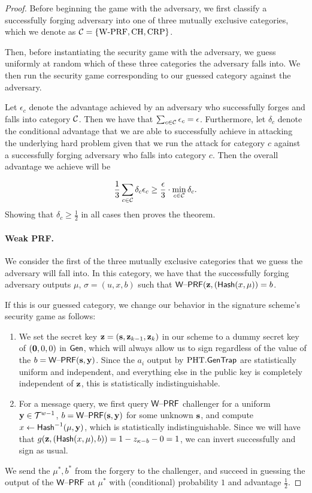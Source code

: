 \begin{proof}
Before beginning the game with the adversary, we first classify a successfully forging adversary into one of three
mutually exclusive categories, which we denote as $\mathcal{C} = \{\text{W-PRF}, \text{CH},
\text{CRP}\}$. 

Then, before instantiating the security game with the adversary, we
guess uniformly at random which of these three categories the
adversary falls into. We then run the security game corresponding to
our guessed category against the adversary. 

Let $\epsilon_{c}$ denote the advantage achieved by an
adversary who successfully forges and falls into category $\mathcal{C}$. Then we
have that $\sum_{c \in \mathcal{C}}\epsilon_{c} = \epsilon$. 
Furthermore, let
$\delta_{c}$ denote the conditional advantage that we are able to
successfully achieve in
attacking the underlying hard problem given that we run the attack for
category $c$ against a successfully forging adversary who falls into
category $c$. Then the overall advantage we achieve will be 

\[\frac{1}{3}\sum_{c \in \mathcal{C}}\delta_{c}\epsilon_{c} \geq
  \frac{\epsilon}{3} \cdot \min_{c \in \mathcal{C}} \delta_{c}.\]
Showing that $\delta_c \geq \tfrac{1}{2}$ in
all cases then proves the theorem.

 \paragraph{Weak PRF.} We consider the first of the three
 mutually exclusive categories that we guess the adversary will fall
 into. In this category, we have that the successfully forging adversary outputs $\mu$,
  $\sigma=(u,x,b)$ such that $\mathsf{W\text{\textendash}PRF}(\mathbf{z},(\mathsf{Hash}(x,\mu))=b$. 

If this is our guessed category, we change our behavior in the
  signature scheme's security game as follows:
\begin{enumerate}
\item
We set the secret key $\mathbf{z}=(\mathbf{s},\mathbf{z}_{k-1},\mathbf{z}_{k})$ in our scheme
  to a dummy secret key of $(\mathbf{0},0,0)$ in $\mathsf{Gen}$, which will
  always allow us to sign regardless of the value of the
  $b=\mathsf{W\text{\textendash}PRF}(\mathbf{s},\mathbf{y})$. 
Since the $a_i$ output by $\text{PHT}.\mathsf{GenTrap}$ are statistically uniform and independent, and everything
else in the public key is completely independent of $\mathbf{z}$, this is
  statistically indistinguishable. 
\item For a message query, we first query
  $\mathsf{W\text{\textendash}PRF}$ challenger for a uniform
  $\mathbf{y} \in \mathcal{T}^{w-1}$, $b=\mathsf{W\text{\textendash}PRF}(\mathbf{s},\mathbf{y})$ for some unknown
  $\mathbf{s}$, and compute $x \gets \mathsf{Hash}^{-1}(\mu,\mathbf{y})$, which is
  statistically indistinguishable. Since we will
  have that $g(\mathbf{z},(\mathsf{Hash}(x,\mu),b))=1-z_{\kappa-b}-0=1$, we can invert
  successfully and sign as usual.
\end{enumerate}
We send the $\mu^*, b^*$ from the forgery to the
  challenger, and succeed in guessing the output of the $\mathsf{W\text{\textendash}PRF}$ at
  $\mu^*$ with (conditional) probability $1$ and advantage
  $\frac{1}{2}$. 


\end{proof}
